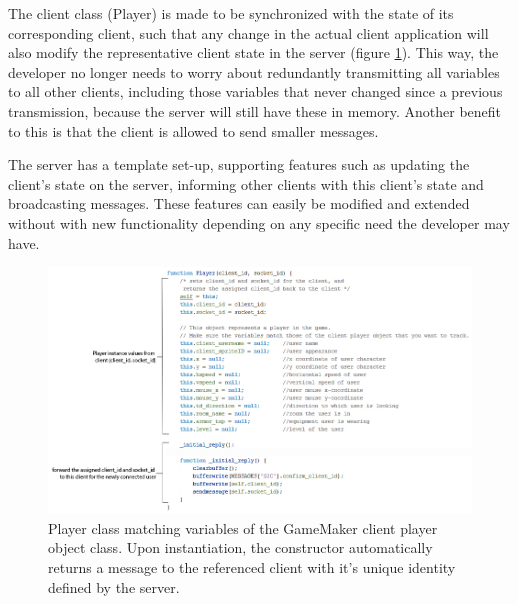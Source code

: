 \documentclass[bsc,frontabs,twoside,singlespacing,parskip,deptreport]{infthesis}     %
\begin{document}
The client class (Player) is made to be synchronized with the state of its corresponding client, such that any change in the actual client application will also modify the representative client state in the server (figure \ref{fig:server_player_construct}). This way, the developer no longer needs to worry about redundantly transmitting all variables to all other clients, including those variables that never changed since a previous transmission, because the server will still have these in memory. Another benefit to this is that the client is allowed to send smaller messages.

The server has a template set-up, supporting features such as updating the client's state on the server, informing other clients with this client's state and broadcasting messages. These features can easily be modified and extended without with new functionality depending on any specific need the developer may have.

\begin{figure}[H]
\includegraphics[scale=0.55]{images/server_player_construct.jpg}
\caption{Player class matching variables of the GameMaker client player object class. Upon instantiation, the constructor automatically returns a message to the referenced client with it's unique identity defined by the server.}
\label{fig:server_player_construct}
\vspace{1em}
\end{figure}
\end{document}
